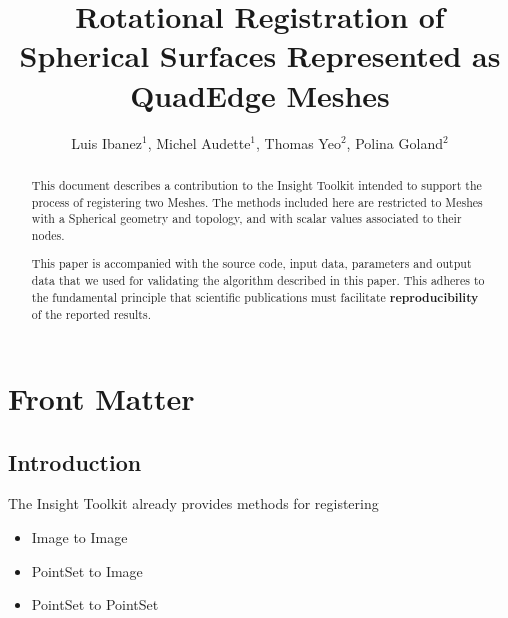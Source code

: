 \documentclass{InsightArticle}
\title{Rotational Registration of Spherical Surfaces Represented as QuadEdge Meshes}
\author{Luis Ibanez$^{1}$, Michel Audette$^{1}$, Thomas Yeo$^{2}$, Polina Goland$^{2}$}
\newcommand{\IJhandlerIDnumber}{3063}
\begin{document}
%
% 
\IJhandlefooter{\IJhandlerIDnumber}


\ifpdf
\else
\fi


\maketitle


\ifhtml
\chapter*{Front Matter\label{front}}
\fi


\begin{abstract}
\noindent
This document describes a contribution to the Insight Toolkit intended to
support the process of registering two Meshes.  The methods included here are
restricted to Meshes with a Spherical geometry and topology, and with scalar
values associated to their nodes.

This paper is accompanied with the source code, input data, parameters and
output data that we used for validating the algorithm described in this paper.
This adheres to the fundamental principle that scientific publications must
facilitate \textbf{reproducibility} of the reported results.
\end{abstract}

\tableofcontents

\section{Introduction}

The Insight Toolkit already provides methods for registering

\begin{itemize}
\item Image to Image
\item PointSet to Image
\item PointSet to PointSet
\end{itemize}
\end{document}
